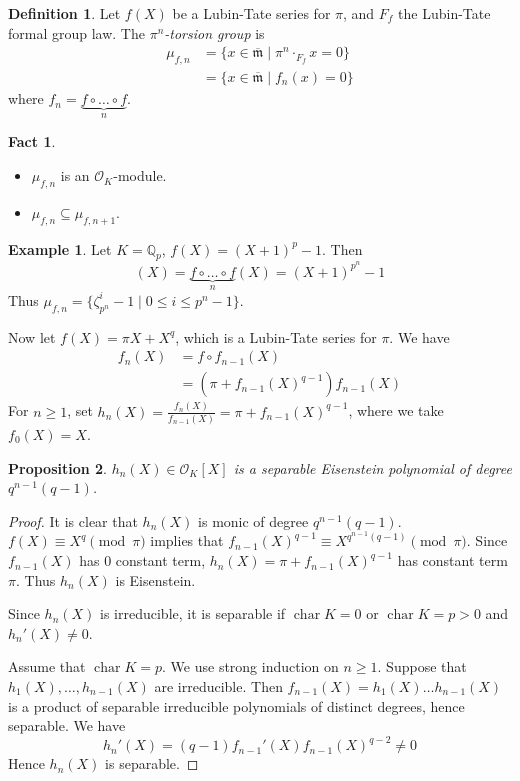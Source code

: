 \documentclass[11pt]{article}
\theoremstyle{definition}
\newtheorem{definition}{Definition}[subsection]
\newtheorem*{example}{Example}
\newtheorem*{fact}{Fact}
\theoremstyle{plain}
\newtheorem{proposition}[definition]{Proposition}
\theoremstyle{remark}
\DeclareMathOperator{\Char}{char}
\newcommand{\QQ}{\mathbb{Q}}
\newcommand{\cO}{\mathcal{O}}
\newcommand{\fm}{\mathfrak{m}}
\begin{document}
\begin{definition}
    Let $f(X)$ be a Lubin-Tate series for $\pi$, and $F_f$ the Lubin-Tate formal group law. The \emph{$\pi^n$-torsion group} is
    \begin{align*}
        \mu_{f, n}
        &= \{x \in \overline{\fm} \mid \pi^n \cdot_{F_f} x = 0\}\\
        &= \{x \in \overline{\fm} \mid f_n(x) = 0\}
    \end{align*}
    where $f_n = \underbrace{f \circ \ldots \circ f}_n$.
\end{definition}

\begin{fact}\phantom{}
    \begin{itemize}
        \item $\mu_{f,n}$ is an $\cO_K$-module.
        \item $\mu_{f,n} \subseteq \mu_{f,n+1}$.
    \end{itemize}
\end{fact}

\begin{example}
    Let $K = \QQ_p$, $f(X) = (X+1)^p - 1$. Then
    \begin{equation*}
        [p^n](X) = \underbrace{f \circ \ldots \circ f}_n(X) = (X+1)^{p^n} - 1
    \end{equation*}
    Thus $\mu_{f,n} = \{\zeta_{p^n}^i - 1 \mid 0 \le i \le p^n-1\}$.
\end{example}

Now let $f(X) = \pi X + X^q$, which is a Lubin-Tate series for $\pi$. We have
\begin{align*}
    f_n(X)
    &= f \circ f_{n-1}(X)\\
    &= (\pi + f_{n-1}(X)^{q-1})f_{n-1}(X)
\end{align*}
For $n \ge 1$, set $h_n(X) = \frac{f_n(X)}{f_{n-1}(X)} = \pi + f_{n-1}(X)^{q-1}$, where we take $f_0(X) = X$.

\begin{proposition}\label{prop:20_3}
    $h_n(X) \in \cO_K[X]$ is a separable Eisenstein polynomial of degree $q^{n-1}(q-1)$.
\end{proposition}
\begin{proof}
    It is clear that $h_n(X)$ is monic of degree $q^{n-1}(q-1)$. $f(X) \equiv X^q \pmod{\pi}$ implies that $f_{n-1}(X)^{q-1} \equiv X^{q^{n-1}(q-1)} \pmod{\pi}$. Since $f_{n-1}(X)$ has $0$ constant term, $h_n(X) = \pi + f_{n-1}(X)^{q-1}$ has constant term $\pi$. Thus $h_n(X)$ is Eisenstein.

    Since $h_n(X)$ is irreducible, it is separable if $\Char K = 0$ or $\Char K = p > 0$ and $h_n'(X) \neq 0$.

    Assume that $\Char K = p$. We use strong induction on $n \ge 1$. Suppose that $h_1(X), \ldots, h_{n-1}(X)$ are irreducible. Then $f_{n-1}(X) = h_1(X) \ldots h_{n-1}(X)$ is a product of separable irreducible polynomials of distinct degrees, hence separable. We have
    \begin{equation*}
        h_n'(X) = (q-1) f_{n-1}'(X) f_{n-1}(X)^{q-2} \neq 0
    \end{equation*}
    Hence $h_n(X)$ is separable.
\end{proof}
\end{document}
